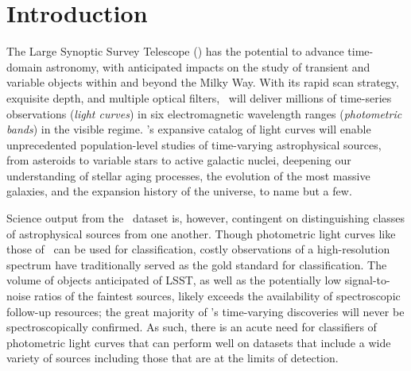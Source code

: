 \section{Introduction}
\label{sec:intro}

The Large Synoptic Survey Telescope (\lsst) has the potential to advance time-domain astronomy, with anticipated impacts on the study of transient and variable objects within and beyond the Milky Way.
With its rapid scan strategy, exquisite depth, and multiple optical filters, \lsst\ will deliver millions of time-series observations (\textit{light curves}) in six electromagnetic wavelength ranges (\textit{photometric bands}) in the visible regime.
\lsst's expansive catalog of light curves will enable unprecedented population-level studies of time-varying astrophysical sources, from asteroids to variable stars to active galactic nuclei, deepening our understanding of stellar aging processes, the evolution of the most massive galaxies, and the expansion history of the universe, to name but a few.

Science output from the \lsst\ dataset is, however, contingent on distinguishing classes of astrophysical sources from one another.
Though photometric light curves like those of \lsst\ can be used for classification, costly observations of a high-resolution spectrum have traditionally served as the gold standard for classification.
The volume of objects anticipated of LSST, as well as the potentially low signal-to-noise ratios of the faintest sources, likely exceeds the availability of spectroscopic follow-up resources; the great majority of \lsst's time-varying discoveries will never be spectroscopically confirmed.
As such, there is an acute need for classifiers of photometric light curves that can perform well on datasets that include a wide variety of sources including those that are at the limits of detection.

